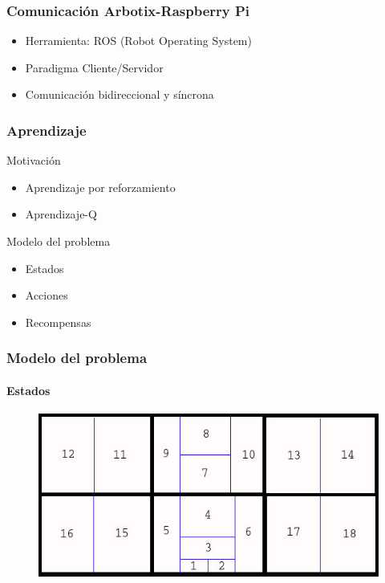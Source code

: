 \documentclass{beamer}
\begin{document}
\begin{frame}
\frametitle{Comunicaci\'on Arbotix-Raspberry Pi}

\begin{itemize}
	\item Herramienta: ROS (Robot Operating System)
	\item Paradigma Cliente/Servidor
	\item Comunicaci\'on bidireccional y s\'incrona
\end{itemize}	

\end{frame}



\begin{frame}
\frametitle{Aprendizaje}

\begin{block}{Motivaci\'on}
\begin{itemize}
	\item Aprendizaje por reforzamiento
	\item Aprendizaje-Q
\end{itemize}
\end{block}	

\begin{block}{Modelo del problema}
\begin{itemize}
	\item Estados
	\item Acciones
	\item Recompensas
\end{itemize}
\end{block}	

\end{frame}


\begin{frame}
\frametitle{Modelo del problema}
\framesubtitle{Estados}
\begin{figure}[hbtp]
\centering
\includegraphics[scale=0.5]{Regiones2.jpg} 
\end{figure}
\end{frame}
\end{document}
